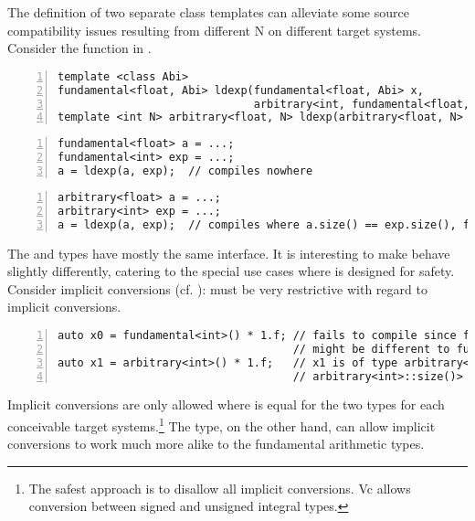 The definition of two separate class templates can alleviate some source compatibility issues resulting from different \code N on different target systems.
Consider the  function in .
\begin{lstlisting}[style=Vc,numbers=left,float,label=lst:ldexp,caption={
  Declaration of \code{ldexp} for \type{fundamental} and \type{arbitrary} (only single-precision \float).
}]
template <class Abi>
fundamental<float, Abi> ldexp(fundamental<float, Abi> x,
                              arbitrary<int, fundamental<float, Abi>::size()> exp);
template <int N> arbitrary<float, N> ldexp(arbitrary<float, N> x, arbitrary<int, N> exp);
\end{lstlisting}
\begin{lstlisting}[style=Vc,numbers=left,float,label=lst:fundamental-ldexp,caption={
  Calls to \code{ldexp} compile or fail to compile independent of the target.
}]
fundamental<float> a = ...;
fundamental<int> exp = ...;
a = ldexp(a, exp);  // compiles nowhere
\end{lstlisting}
\begin{lstlisting}[style=Vc,numbers=left,float,label=lst:arbitrary-ldexp,caption={
  Calls to \code{ldexp} compile or fail to compile depending on the target.
}]
arbitrary<float> a = ...;
arbitrary<int> exp = ...;
a = ldexp(a, exp);  // compiles where a.size() == exp.size(), fails otherwise
\end{lstlisting}


The  and  types have mostly the same interface.
It is interesting to make  behave slightly differently, catering to the special use cases where  is designed for safety.
Consider implicit conversions (cf. ):  must be very restrictive with regard to implicit conversions.
\begin{lstlisting}[style=Vc,numbers=left,float,label=lst:implicit conversion,caption={
  Implicit conversions behave differently for \type{fundamental} and \type{arbitrary}.
}]
auto x0 = fundamental<int>() * 1.f; // fails to compile since fundamental<int>::size()
                                    // might be different to fundamental<float>::size()
auto x1 = arbitrary<int>() * 1.f;   // x1 is of type arbitrary<float,
                                    // arbitrary<int>::size()>
\end{lstlisting}
Implicit conversions are only allowed where  is equal for the two types for each conceivable target systems.\footnote{
  The safest approach is to disallow all implicit conversions.
  Vc allows conversion between signed and unsigned integral types.
}
The  type, on the other hand, can allow implicit conversions to work much more alike to the fundamental arithmetic types.
